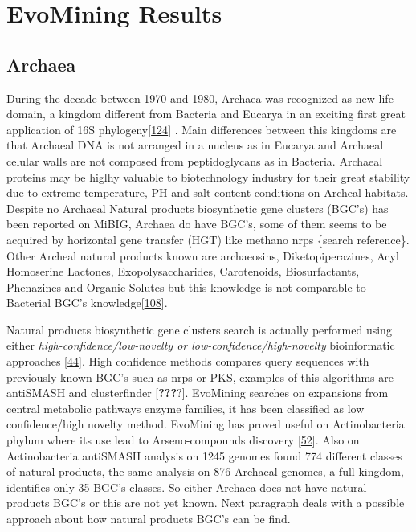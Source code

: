 \documentclass[12pt,twoside]{reedthesis}
\begin{document}
  \hypertarget{ref_labels}{\chapter{EvoMining Results}\label{ref_labels}}
  
  \section{Archaea}\label{archaea}
  
  During the decade between 1970 and 1980, Archaea was recognized as new
  life domain, a kingdom different from Bacteria and Eucarya in an
  exciting first great application of 16S
  phylogeny{[}\protect\hyperlink{ref-woese_phylogenetic_1977}{124}{]} .
  Main differences between this kingdoms are that Archaeal DNA is not
  arranged in a nucleus as in Eucarya and Archaeal celular walls are not
  composed from peptidoglycans as in Bacteria. Archaeal proteins may be
  higlhy valuable to biotechnology industry for their great stability due
  to extreme temperature, PH and salt content conditions on Archeal
  habitats. Despite no Archaeal Natural products biosynthetic gene
  clusters (BGC's) has been reported on MiBIG, Archaea do have BGC's, some
  of them seems to be acquired by horizontal gene transfer (HGT) like
  methano nrps \{search reference\}. Other Archeal natural products known
  are archaeosins, Diketopiperazines, Acyl Homoserine Lactones,
  Exopolysaccharides, Carotenoids, Biosurfactants, Phenazines and Organic
  Solutes but this knowledge is not comparable to Bacterial BGC's
  knowledge{[}\protect\hyperlink{ref-charlesworth_untapped_2015}{108}{]}.
  
  Natural products biosynthetic gene clusters search is actually performed
  using either \emph{high-confidence/low-novelty or
  low-confidence/high-novelty} bioinformatic approaches
  {[}\protect\hyperlink{ref-medema_computational_2015}{44}{]}. High
  confidence methods compares query sequences with previously known BGC's
  such as nrps or PKS, examples of this algorithms are antiSMASH and
  clusterfinder {[}{\textbf{???}}?{]}. EvoMining searches on expansions
  from central metabolic pathways enzyme families, it has been classified
  as low confidence/high novelty method. EvoMining has proved useful on
  Actinobacteria phylum where its use lead to Arseno-compounds discovery
  {[}\protect\hyperlink{ref-cruz-morales_phylogenomic_2016}{52}{]}. Also
  on Actinobacteria antiSMASH analysis on 1245 genomes found 774 different
  classes of natural products, the same analysis on 876 Archaeal genomes,
  a full kingdom, identifies only 35 BGC's classes. So either Archaea does
  not have natural products BGC's or this are not yet known. Next
  paragraph deals with a possible approach about how natural products
  BGC's can be find.
  
\end{document}
